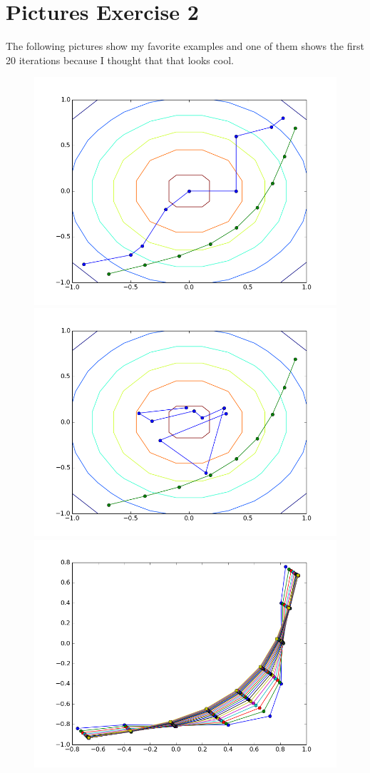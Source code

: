 \documentclass{article}
\begin{document}
\section{Pictures Exercise 2}
The following pictures show my favorite examples and one of them shows the first
20 iterations because I thought that that looks cool.
\begin{figure}[h]
  \centering
  \includegraphics[scale=0.5]{ex2.png}
\includegraphics[scale=0.5]{ex22.png}
\includegraphics[scale=0.5]{ex2m.png}
\end{figure}
\end{document}
